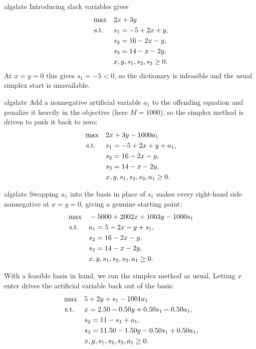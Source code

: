 \begin{steppanel}{algslate}
 Introducing slack variables gives
\[
\begin{aligned}
\max\quad & 2x + 3y \\
\text{ s.t. }\quad & s_1 = -5 + 2x + y,\\
& s_2 = 16 - 2x - y,\\
& s_3 = 14 - x - 2y,\\
& x, y, s_1, s_2, s_3 \ge 0.
\end{aligned}
\]
At $x=y=0$ this gives $s_1=-5<0$, so the dictionary is infeasible and the usual simplex start is unavailable.
\end{steppanel}

\begin{steppanel}{algslate}
 Add a nonnegative artificial variable $a_1$ to the offending equation and penalize it heavily in the objective (here $M=1000$), so the simplex method is driven to push it back to zero:
\[
\begin{aligned}
\max\quad & 2x + 3y - 1000a_1 \\
\text{ s.t. }\quad & s_1 = -5 + 2x + y + a_1,\\
& s_2 = 16 - 2x - y,\\
& s_3 = 14 - x - 2y,\\
& x, y, s_1, s_2, s_3, a_1 \ge 0.
\end{aligned}
\]
\end{steppanel}

\begin{steppanel}{algslate}
 Swapping $a_1$ into the basis in place of $s_1$ makes every right-hand side nonnegative at $x=y=0$, giving a genuine starting point:
\[
\begin{aligned}
\max\quad & -5000 + 2002x + 1003y - 1000s_1 \\
\text{ s.t. }\quad & a_1 = 5 - 2x - y + s_1,\\
& s_2 = 16 - 2x - y,\\
& s_3 = 14 - x - 2y,\\
& x, y, s_1, s_2, s_3, a_1 \ge 0.
\end{aligned}
\]
\end{steppanel}

With a feasible basis in hand, we run the simplex method as usual. Letting $x$ enter drives the artificial variable back out of the basis:
\[
\begin{aligned}
\max\quad & 5 + 2y + s_1 - 1001a_1 \\
\text{ s.t. }\quad & x = 2.50 - 0.50y + 0.50s_1 - 0.50a_1,\\
& s_2 = 11 - s_1 + a_1,\\
& s_3 = 11.50 - 1.50y - 0.50s_1 + 0.50a_1,\\
& x, y, s_1, s_2, s_3, a_1 \ge 0.
\end{aligned}
\]

